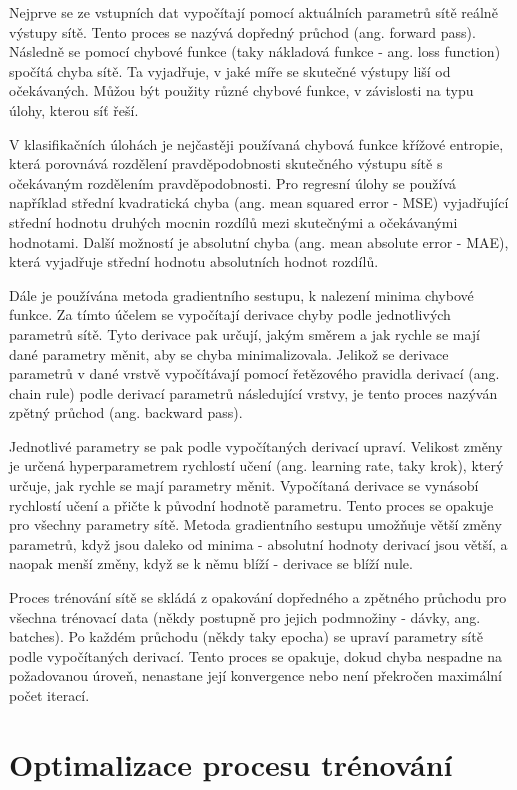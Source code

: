 Nejprve se ze vstupních dat vypočítají pomocí aktuálních parametrů sítě reálně
výstupy sítě. Tento proces se nazývá dopředný průchod (ang. forward pass).
Následně se pomocí chybové funkce (taky nákladová funkce - ang. loss function)
spočítá chyba sítě. Ta vyjadřuje, v jaké míře se skutečné výstupy liší od
očekávaných. Můžou být použity různé chybové funkce, v závislosti na typu
úlohy, kterou síť řeší.

V klasifikačních úlohách je nejčastěji používaná chybová funkce křížové
entropie, která porovnává rozdělení pravděpodobnosti skutečného výstupu sítě s
očekávaným rozdělením pravděpodobnosti. Pro regresní úlohy se používá například
střední kvadratická chyba (ang. mean squared error - MSE) vyjadřující střední
hodnotu druhých mocnin rozdílů mezi skutečnými a očekávanými hodnotami. Další
možností je absolutní chyba (ang. mean absolute error - MAE), která vyjadřuje
střední hodnotu absolutních hodnot rozdílů.

Dále je používána metoda gradientního sestupu, k nalezení minima chybové
funkce. Za tímto účelem se vypočítají derivace chyby podle jednotlivých
parametrů sítě. Tyto derivace pak určují, jakým směrem a jak rychle se mají
dané parametry měnit, aby se chyba minimalizovala. Jelikož se derivace
parametrů v dané vrstvě vypočítávají pomocí řetězového pravidla derivací (ang.
chain rule) podle derivací parametrů následující vrstvy, je tento proces
nazýván zpětný průchod (ang. backward pass).

Jednotlivé parametry se pak podle vypočítaných derivací upraví. Velikost změny
je určená hyperparametrem rychlostí učení (ang. learning rate, taky krok),
který určuje, jak rychle se mají parametry měnit. Vypočítaná derivace se
vynásobí rychlostí učení a přičte k původní hodnotě parametru. Tento proces se
opakuje pro všechny parametry sítě. Metoda gradientního sestupu umožňuje větší
změny parametrů, když jsou daleko od minima - absolutní hodnoty derivací jsou
větší, a naopak menší změny, když se k němu blíží - derivace se blíží nule.

Proces trénování sítě se skládá z opakování dopředného a zpětného průchodu pro
všechna trénovací data (někdy postupně pro jejich podmnožiny - dávky, ang.
batches). Po každém průchodu (někdy taky epocha) se upraví parametry sítě podle
vypočítaných derivací. Tento proces se opakuje, dokud chyba nespadne na
požadovanou úroveň, nenastane její konvergence nebo není překročen maximální
počet iterací.

\section{Optimalizace procesu trénování}

